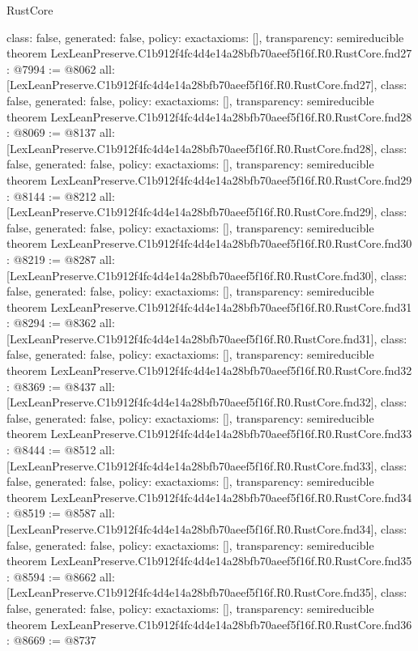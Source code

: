 \begin{lexlean}{RustCore}
\begin{coremodule}
{  class: false,
  generated: false,
  policy: exact{axioms: []},
  transparency: semireducible
}
theorem LexLeanPreserve.C1b912f4fc4d4e14a28bfb70aeef5f16f.R0.RustCore.fnd27 : @7994 := @8062 {
  all: [LexLeanPreserve.C1b912f4fc4d4e14a28bfb70aeef5f16f.R0.RustCore.fnd27],
  class: false,
  generated: false,
  policy: exact{axioms: []},
  transparency: semireducible
}
theorem LexLeanPreserve.C1b912f4fc4d4e14a28bfb70aeef5f16f.R0.RustCore.fnd28 : @8069 := @8137 {
  all: [LexLeanPreserve.C1b912f4fc4d4e14a28bfb70aeef5f16f.R0.RustCore.fnd28],
  class: false,
  generated: false,
  policy: exact{axioms: []},
  transparency: semireducible
}
theorem LexLeanPreserve.C1b912f4fc4d4e14a28bfb70aeef5f16f.R0.RustCore.fnd29 : @8144 := @8212 {
  all: [LexLeanPreserve.C1b912f4fc4d4e14a28bfb70aeef5f16f.R0.RustCore.fnd29],
  class: false,
  generated: false,
  policy: exact{axioms: []},
  transparency: semireducible
}
theorem LexLeanPreserve.C1b912f4fc4d4e14a28bfb70aeef5f16f.R0.RustCore.fnd30 : @8219 := @8287 {
  all: [LexLeanPreserve.C1b912f4fc4d4e14a28bfb70aeef5f16f.R0.RustCore.fnd30],
  class: false,
  generated: false,
  policy: exact{axioms: []},
  transparency: semireducible
}
theorem LexLeanPreserve.C1b912f4fc4d4e14a28bfb70aeef5f16f.R0.RustCore.fnd31 : @8294 := @8362 {
  all: [LexLeanPreserve.C1b912f4fc4d4e14a28bfb70aeef5f16f.R0.RustCore.fnd31],
  class: false,
  generated: false,
  policy: exact{axioms: []},
  transparency: semireducible
}
theorem LexLeanPreserve.C1b912f4fc4d4e14a28bfb70aeef5f16f.R0.RustCore.fnd32 : @8369 := @8437 {
  all: [LexLeanPreserve.C1b912f4fc4d4e14a28bfb70aeef5f16f.R0.RustCore.fnd32],
  class: false,
  generated: false,
  policy: exact{axioms: []},
  transparency: semireducible
}
theorem LexLeanPreserve.C1b912f4fc4d4e14a28bfb70aeef5f16f.R0.RustCore.fnd33 : @8444 := @8512 {
  all: [LexLeanPreserve.C1b912f4fc4d4e14a28bfb70aeef5f16f.R0.RustCore.fnd33],
  class: false,
  generated: false,
  policy: exact{axioms: []},
  transparency: semireducible
}
theorem LexLeanPreserve.C1b912f4fc4d4e14a28bfb70aeef5f16f.R0.RustCore.fnd34 : @8519 := @8587 {
  all: [LexLeanPreserve.C1b912f4fc4d4e14a28bfb70aeef5f16f.R0.RustCore.fnd34],
  class: false,
  generated: false,
  policy: exact{axioms: []},
  transparency: semireducible
}
theorem LexLeanPreserve.C1b912f4fc4d4e14a28bfb70aeef5f16f.R0.RustCore.fnd35 : @8594 := @8662 {
  all: [LexLeanPreserve.C1b912f4fc4d4e14a28bfb70aeef5f16f.R0.RustCore.fnd35],
  class: false,
  generated: false,
  policy: exact{axioms: []},
  transparency: semireducible
}
theorem LexLeanPreserve.C1b912f4fc4d4e14a28bfb70aeef5f16f.R0.RustCore.fnd36 : @8669 := @8737 {
}
\end{coremodule}
\end{lexlean}
